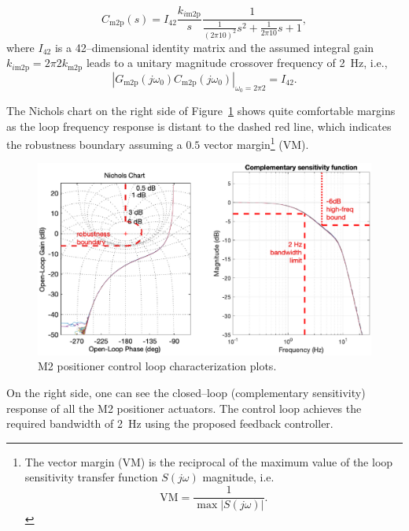 \begin{equation}
\label{eq:C_m2p}
C_\text{m2p}(s) = I_{42} \frac{k_{i\text{m2p}}}{s} \frac{1}{\frac{1}{\left(2\pi10\right)^2}s^2 + \frac{1}{2\pi10}s+1} ,
\end{equation}
where $I_{42}$ is a 42--dimensional identity matrix and the assumed integral gain $k_{i\text{m2p}} = 2 \pi 2 k_\text{m2p}$ leads to a unitary magnitude crossover frequency of \SI{2}{Hz}, i.e., 
\[\left|G_\text{m2p}(j\omega_0)C_\text{m2p}(j\omega_0)\right|_{\omega_0 = 2\pi2} = I_{42} .\]

The Nichols chart on the right side of Figure~\ref{fig:m2P_nichols_T} shows quite comfortable margins as the loop frequency response is distant to the dashed red line, which indicates the robustness boundary assuming a $0.5$ vector margin\footnote{The vector margin (VM) is the reciprocal of the maximum value of the loop sensitivity transfer function $S\left(j\omega\right)$ magnitude, i.e.$$\text{VM}=\frac{1}{\max \left|S(j\omega)\right|}.$$} (VM). %
%
\begin{figure}[!hbt]
    \vspace{6pt}
    \centering
    \includegraphics[width=\textwidth]{./ctrl_sec_images/m2P_nichols_T.eps}
    \caption{M2 positioner control loop characterization plots.}
    \label{fig:m2P_nichols_T}
\end{figure}
%
On the right side, one can see the closed--loop (complementary sensitivity) response of all the M2 positioner actuators. The control loop achieves the required bandwidth of \SI{2}{Hz} using the proposed feedback controller. %

